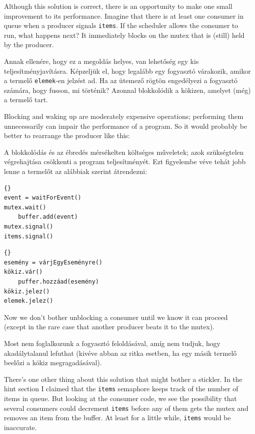 \documentclass{book}
\begin{document}
Although this solution is correct, there is an opportunity
to make one small improvement to its performance.  Imagine
that there is at least one consumer in queue when a producer
signals {\tt items}.  If the scheduler allows the consumer
to run, what happens next?  It immediately blocks on the
mutex that is (still) held by the producer.

Annak ellenére, hogy ez a megoldás helyes,
van lehetőség egy kis teljesítményjavításra.
Képzeljük el, hogy legalább egy fogyasztó várakozik,
amikor a termelő {\tt elemek}-en jelzést ad. Ha az ütemező rögtön engedélyezi a fogyasztó számára, hogy fusson,
mi történik? Azonnal blokkolódik a kökizen, amelyet (még) a termelő tart.

Blocking and waking up are moderately expensive operations;
performing them unnecessarily can impair the performance of
a program.  So it would probably be better to rearrange the
producer like this:

A blokkolódás és az ébredés mérsékelten költséges műveletek;
azok szükségtelen végrehajtása csökkenti a program teljesítményét.
Ezt figyelembe véve tehát jobb lenne a termelőt az alábbiak szerint átrendezni:

\begin{lstlisting}[title={Improved producer solution}]{}
event = waitForEvent()
mutex.wait()
    buffer.add(event)
mutex.signal()
items.signal()
\end{lstlisting}

\begin{lstlisting}[title={Javított termelő megoldás}]{}
esemény = várjEgyEseményre()
kökiz.vár()
    puffer.hozzáad(esemény)
kökiz.jelez()
elemek.jelez()
\end{lstlisting}

Now we don't bother unblocking a consumer until we know it can proceed
(except in the rare case that another producer beats it to the mutex).

Most nem foglalkozunk a fogyasztó feloldásával, amíg nem tudjuk,
hogy akadálytalanul lefuthat (kivéve abban az ritka esetben,
ha egy másik termelő beelőzi a kökiz megragadásával).

There's one other thing about this solution that might bother
a stickler.  In the hint section I claimed that the {\tt items}
semaphore keeps track of the number of items in queue.  But looking
at the consumer code, we see the possibility that several consumers
could decrement {\tt items} before any of them gets the mutex
and removes an item from the buffer.  At least for a little while,
{\tt items} would be inaccurate.
\end{document}
